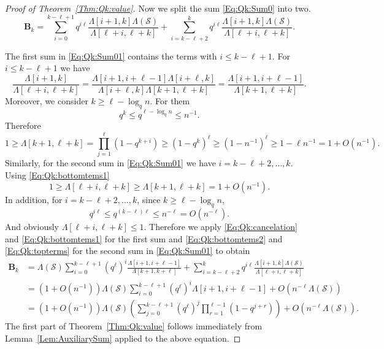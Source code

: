 \documentclass[letterpaper,11pt]{article}
\theoremstyle{definition}
\theoremstyle{remark}
\renewcommand{\le}{\leqslant}
\renewcommand{\ge}{\geqslant}
\newcommand{\product}{\Lambda}
\newcommand{\productO}{\Lambda(\cS)}
\newcommand{\bB}{\mathbf{B}}
\newcommand{\cS}{\mathcal{S}}
\begin{document}
\begin{proof}[Proof of Theorem~\ref{Thm:Qk:value}]
	Now we split the sum \eqref{Eq:Qk:Sum0} into two. 
	\begin{equation}\label{Eq:Qk:Sum01}
		\bB_{k}=\sum_{i=0}^{k-\ell+1} q^{i\ell}\frac{\product[i+1,k]\productO}{\product[\ell+i,\ell+k]}+\sum_{i=k-\ell+2}^{k} q^{i\ell}\frac{\product[i+1,k]\productO}{\product[\ell+i,\ell+k]}.
	\end{equation}
	
	
	The first sum in \eqref{Eq:Qk:Sum01} contains the terms with $i\le k-\ell+1$. For $i\le k-\ell+1$ we have
	\begin{equation}\label{Eq:Qk:cancelation}
		\frac{\product[i+1,k]}{\product[\ell+i,\ell+k]}
		=
		\frac{\product[i+1,i+\ell-1]\product[i+\ell,k]}{\product[i+\ell,k]\product[k+1,\ell+k]}
		=\frac{\product[i+1,i+\ell-1]}{\product[k+1,\ell+k]}.
	\end{equation}
	Moreover, we consider $k\ge \ell -\log_q n$. For them
	\[
	q^k\le q^{\ell-\log_q n}\le n^{-1}.\]
	Therefore
	\begin{equation}\label{Eq:Qk:bottomtems1}  
		1\ge\product[k+1,\ell+k] = \prod_{j=1}^{\ell}(1-q^{k+i}) \ge (1-q^{k})^\ell \ge (1-n^{-1})^\ell\ge 1-\ell n^{-1}=1+O(n^{-1}).
	\end{equation}
	Similarly, for the second sum in \eqref{Eq:Qk:Sum01} we have $i=k-\ell+2,\ldots,k$.  Using \eqref{Eq:Qk:bottomtems1} 
	\begin{equation}\label{Eq:Qk:bottomtems2}  
		1\ge \product[\ell+i,\ell+k]\ge \product[k+1,\ell+k] = 1+O(n^{-1}).
	\end{equation}
	In addition, for $i=k-\ell+2,\ldots,k$, since $k\ge \ell -\log_q n$,
	\begin{equation}\label{Eq:Qk:topterms}
		q^{i\ell}\le q^{(k-\ell)\ell}\le n^{-\ell}=O(n^{-\ell}). 
	\end{equation}
	And obviously $\product[\ell+i,\ell+k]\le 1$. Therefore
	we apply \eqref{Eq:Qk:cancelation} and \eqref{Eq:Qk:bottomtems1} for the first sum and \eqref{Eq:Qk:bottomtems2} and \eqref{Eq:Qk:topterms} for the second sum in \eqref{Eq:Qk:Sum01} to obtain
	\begin{equation}\label{Eq:Qk:Sum1}
		\begin{split}
			\bB_{k}
			&=\productO\sum_{i=0}^{k-\ell+1}\left(q^{\ell}\right)^i\frac{\product[i+1,i+\ell-1]}{\product[k+1,k+\ell]}+\sum_{i=k-\ell+2}^{k}q^{i\ell}\frac{\product[i+1,k]\productO}{\product[\ell+i,\ell+k]}\\
			&=(1+O(n^{-1}))\productO\sum_{i=0}^{k-\ell+1}\left(q^{\ell}\right)^i\product[i+1,i+\ell-1]+O(n^{-\ell}\productO)\\
			&=(1+O(n^{-1}))\productO\left(\sum_{j=0}^{k-\ell+1}\left(q^{\ell}\right)^j\prod_{r=1}^{\ell-1}(1-q^{j+r})\right)+O(n^{-\ell}\productO).
		\end{split}
	\end{equation}
	The first part of Theorem~\ref{Thm:Qk:value} follows immediately from Lemma~\ref{Lem:AuxiliarySum} applied to the above equation.
	

\end{proof}
\end{document}
